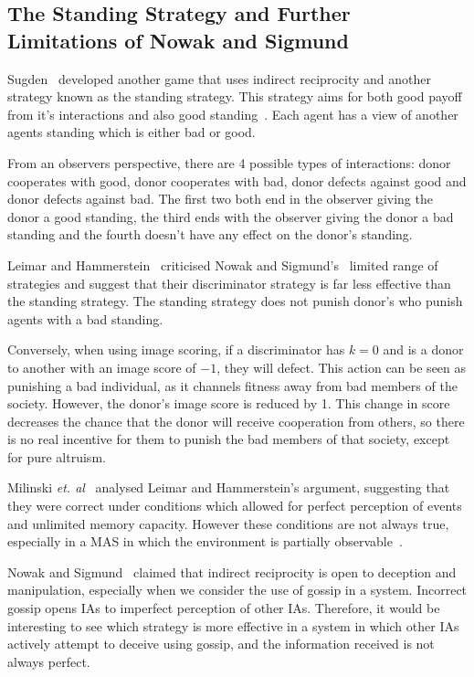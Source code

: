 \documentclass[]{final_report}
\begin{document}
\subsection{The Standing Strategy and Further Limitations of Nowak and Sigmund}
Sugden~\cite{sugden2004economics} developed another game that uses indirect reciprocity and another strategy known as the standing strategy. This strategy aims for both good payoff from it's interactions and also good standing~\cite{imagevsstanding}. Each agent has a view of another agents standing which is either bad or good.\par 
From an observers perspective, there are 4 possible types of interactions: donor cooperates with good, donor cooperates with bad, donor defects against good and donor defects against bad. The first two both end in the observer giving the donor a good standing, the third ends with the observer giving the donor a bad standing and the fourth doesn't have any effect on the donor's standing.\par 
Leimar and Hammerstein~\cite{leimarhammer} criticised Nowak and Sigmund's~\cite{evol_indirect_image} limited range of strategies and suggest that their discriminator strategy is far less effective than the standing strategy. The standing strategy does not punish donor's who punish agents with a bad standing.\par 
Conversely, when using image scoring, if a discriminator has $k=0$ and is a donor to another with an image score of $-1$, they will defect. This action can be seen as punishing a bad individual, as it channels fitness away from bad members of the society. However, the donor's image score is reduced by 1. This change in score decreases the chance that the donor will receive cooperation from others, so there is no real incentive for them to punish the bad members of that society, except for pure altruism.\par 
Milinski \textit{et. al}~\cite{imagevsstanding} analysed Leimar and Hammerstein's argument, suggesting that they were correct under conditions which allowed for perfect perception of events and unlimited memory capacity. However these conditions are not always true, especially in a MAS in which the environment is partially observable~\cite{russell2016artificial}.\par
Nowak and Sigmund~\cite{evol_indirect_image} claimed that indirect reciprocity is open to deception and manipulation, especially when we consider the use of gossip in a system. Incorrect gossip opens IAs to imperfect perception of other IAs. Therefore, it would be interesting to see which strategy is more effective in a system in which other IAs actively attempt to deceive using gossip, and the information received is not always perfect.
\end{document}
